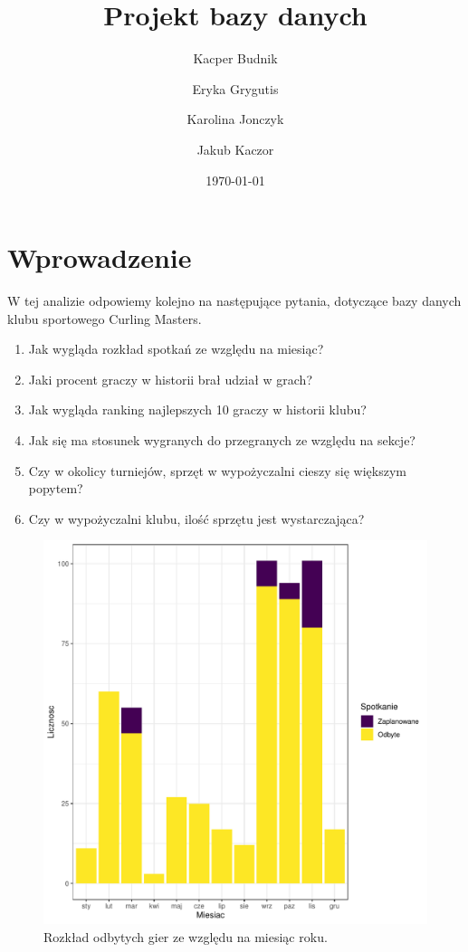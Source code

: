 \documentclass{mwart}\usepackage[]{graphicx}\usepackage[]{xcolor}
\author {
    Kacper Budnik
    \and
    Eryka Grygutis
    \and
    Karolina Jonczyk
    \and
    Jakub Kaczor
}
\title {Projekt bazy danych}
\date \today
\makeatletter
\def\maxwidth{ %
  \ifdim\Gin@nat@width>\linewidth
    \linewidth
  \else
    \Gin@nat@width
  \fi
}
\newenvironment{knitrout}{}{} %
\makeatother
\begin{document}
\maketitle



\section*{Wprowadzenie}
W tej analizie odpowiemy kolejno na następujące pytania, dotyczące bazy
danych klubu sportowego Curling Masters.
\begin{enumerate}
    \item Jak wygląda rozkład spotkań ze względu na miesiąc?
    \item Jaki procent graczy w historii brał udział w grach?
    \item Jak wygląda ranking najlepszych 10 graczy w historii klubu?
    \item Jak się ma stosunek wygranych do przegranych ze względu na
        sekcje?
    \item Czy w okolicy turniejów, sprzęt w wypożyczalni cieszy się
        większym popytem?
    \item Czy w wypożyczalni klubu, ilość sprzętu jest wystarczająca?
\end{enumerate}
\begin{knitrout}
\color{fgcolor}\begin{figure}
\includegraphics[width=\maxwidth]{figure/unnamed-chunk-2-1} \caption[Rozkład odbytych gier ze względu na miesiąc roku]{Rozkład odbytych gier ze względu na miesiąc roku.}\label{fig:unnamed-chunk-2}
\end{figure}

\end{knitrout}
\end{document}
